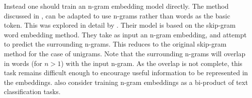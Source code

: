 \documentclass[12pt,parskip]{komatufte}
\begin{document}


Instead one should train an n-gram embedding model directly.
The method discussed in , can be adapted to use n-grams rather than words as the basic token.
This was explored in detail by .
Their model is based on the skip-gram word embedding method.
They take as input an n-gram embedding, and attempt to predict the surrounding n-grams.
This reduces to the original skip-gram method for the case of unigrams.
Note that the surrounding n-grams will overlap in words (for $n>1$)  with the input n-gram.
As the overlap is not complete, this task remains difficult enough to encourage useful information to be represented in the embeddings.
\textcite{li2017neural} also consider training n-gram embeddings as a bi-product of text classification tasks.
\end{document}
